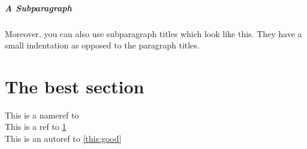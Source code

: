 \subparagraph{A Subparagraph} Moreover, you can also use subparagraph titles which look like this. They have a small indentation as opposed to the paragraph titles.


\section{The best section}
\label{this:good}

This is a nameref to \\
This is a ref to \ref{this:good}\\
This is an autoref to \autoref{this:good}\\